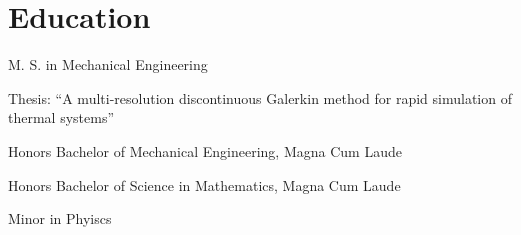\section{Education}
%
\begin{position}
  \begin{myitem}
  \item M. S. in Mechanical Engineering
  \item Thesis: ``A multi-resolution discontinuous Galerkin method for rapid simulation of thermal systems''
  \end{myitem}
  \begin{myitem}
  \item Honors Bachelor of Mechanical Engineering, Magna Cum Laude
  \item Honors Bachelor of Science in Mathematics, Magna Cum Laude
  \item Minor in Phyiscs
  \end{myitem}
\end{position}
